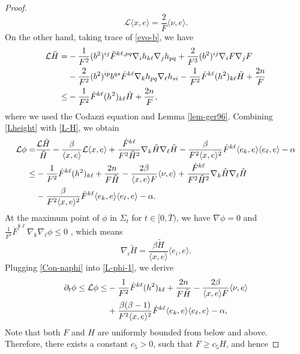 \documentclass[11pt,reqno]{amsart}
\theoremstyle{definition}
\theoremstyle{remark}
\numberwithin{equation}{section}
\renewcommand{\(}{\left(}
\renewcommand{\)}{\right)}
\renewcommand{\-}{\overline}
\begin{document}
\begin{proof}
\begin{equation}
	\mathcal{L}\langle x,e\rangle=\frac{2}{F}\langle\nu,e\rangle.
\end{equation}
On the other hand, taking trace of \eqref{evo-b}, we have
\begin{align}
	\mathcal{L}{\tilde{H}}=&-\frac{1}{F^2}(b^2)^{ij}\ddot{F}^{k\ell,pq}\nabla_i{h_{k\ell}}\nabla_j{h_{pq}}+\frac{2}{F^3}(b^2)^{ij}\nabla_i F\nabla_j F\notag\\
	&-\frac{2}{F^2}(b^2)^{ip}b^{qs}\dot{F}^{k\ell}\nabla_k{h_{pq}}\nabla_{\ell}{h_{si}}-\frac{1}{F^2}\dot{F}^{k\ell}(h^2)_{k\ell}\tilde{H}+\frac{2n}{F}\notag\\
	\leq& -\frac{1}{F^2}\dot{F}^{k\ell}(h^2)_{k\ell}\tilde{H}+\frac{2n}{F},\label{L-H}
\end{align}
where we used the Codazzi equation  and Lemma \ref{lem-ger96}. Combining \eqref{Lheight} with \eqref{L-H}, we obtain
\begin{align}
	\mathcal{L}\phi=&\frac{\mathcal{L}{\tilde{H}}}{\tilde{H}}-\frac{\beta}{\langle x,e\rangle}\mathcal{L}{\langle x,e\rangle}+\frac{\dot{F}^{k\ell}}{F^2\tilde{H}^2}\nabla_k{\tilde{H}}\nabla_{\ell}{\tilde{H}}-\frac{\beta}{F^2\langle x,e\rangle^2}\dot{F}^{k\ell}\langle e_k,e\rangle\langle e_{\ell},e\rangle-\alpha\notag\\
	\leq &-\frac{1}{F^2}\dot{F}^{k\ell}(h^2)_{k\ell}+\frac{2n}{F\tilde{H}}-\frac{2\beta}{\langle x,e\rangle F}\langle\nu,e\rangle+\frac{\dot{F}^{k\ell}}{F^2\tilde{H}^2}\nabla_k{\tilde{H}}\nabla_{\ell}{\tilde{H}}\notag\\
	&-\frac{\beta}{F^2\langle x,e\rangle^2}\dot{F}^{k\ell}\langle e_k,e\rangle\langle e_{\ell},e\rangle-\alpha.\label{L-phi-1}
\end{align}
At the maximum point of $\phi$ in $\Sigma_t$ for $t\in[0,\bar{T})$, we have $\nabla\phi=0$ and $\frac{1}{F^2}\dot{F}^{k\ell}\nabla_k\nabla_{\ell}\phi\leq 0$ , which means
\begin{equation}\label{Con-naphi}
	\nabla_i{\tilde{H}}=\frac{\beta\tilde{H}}{\langle x,e\rangle}\langle e_i,e\rangle.
\end{equation}
Plugging \eqref{Con-naphi} into \eqref{L-phi-1}, we derive
\begin{align}
	\partial_t\phi\leq\mathcal{L}{\phi}\leq&-\frac{1}{F^2}\dot{F}^{k\ell}(h^2)_{k\ell}+\frac{2n}{F\tilde{H}}-\frac{2\beta}{\langle x,e\rangle F}\langle\nu,e\rangle\notag\\
	&+\frac{\beta(\beta-1)}{F^2\langle x,e\rangle^2}\dot{F}^{k\ell}\langle e_k,e\rangle\langle e_{\ell},e\rangle-\alpha,
\end{align}
Note that both $F$ and $H$ are uniformly bounded from below and above. Therefore,  there exists a constant $c_5>0$, such that $F\geq c_5 H$, and hence

\end{proof}
\end{document}
